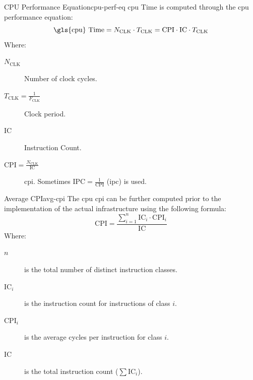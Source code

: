 \begin{definition}{CPU Performance Equation}{cpu-perf-eq}
    \gls{cpu} Time is computed through the \gls{cpu} performance equation:
    \[
        \text{\gls{cpu} Time} = N_{\text{CLK}} \cdot T_{\text{CLK}} = \text{CPI} \cdot \text{IC} \cdot T_{\text{CLK}}
    \]
    Where:
    \begin{description}
        \item[\(N_{\text{CLK}}\)] Number of clock cycles.
        \item[\(T_{\text{CLK}} = \frac{1}{F_{\text{CLK}}}\)] Clock period.
        \item[\(\text{IC}\)] Instruction Count.
        \item[\(\text{CPI} = \frac{N_{\text{CLK}}}{\text{IC}}\)] \gls{cpi}.
        \subitem Sometimes \(\text{IPC} = \frac{1}{\text{CPI}}\) (\gls{ipc}) is used.
    \end{description}
\end{definition}


\begin{definition}{Average CPI}{avg-cpi}
    The \gls{cpu} \gls{cpi} can be further computed prior to the implementation of the actual infrastructure using the following formula:
    \[
        \text{CPI} = \frac{\sum_{i=1}^n \text{IC}_i \cdot \text{CPI}_i}{\text{IC}}
    \]
    Where:
    \begin{description}
        \item[\(n\)] is the total number of distinct instruction classes.
        \item[\(\text{IC}_i\)] is the instruction count for instructions of class \(i\).
        \item[\(\text{CPI}_i\)] is the average cycles per instruction for class \(i\).
        \item[\(\text{IC}\)] is the total instruction count (\(\sum \text{IC}_i\)).
    \end{description}
\end{definition}

